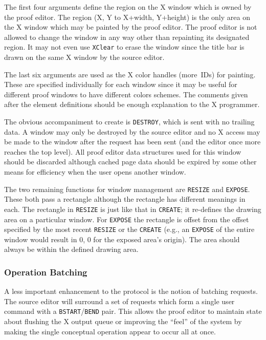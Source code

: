 The first four arguments define the region on the X window which is
owned by the proof editor.  The region (X, Y to X+width, Y+height)
is the only area on the X window which may be painted by the proof
editor.  The proof editor is not allowed to change the window in any
way other than repainting its designated region.  It may not even
use {\tt XClear} to erase the window since the title bar is drawn on
the same X window by the source editor.

The last six arguments are used as the X color handles (more~IDs) for
painting.  These are specified individually for each window since it
may be useful for different proof windows to have different colors
schemes.  The comments given after the element definitions should be
enough explanation to the X programmer.

The obvious accompaniment to create is {\tt DESTROY}, which is sent
with no trailing data.  A window may only be destroyed by the source
editor and no X access may be made to the window after the request
has been sent (and the editor once more reaches the top level).  All
proof editor data structures used for this window should be discarded
although cached page data should be expired by some other means for
efficiency when the user opens another window.

The two remaining functions for window management are {\tt RESIZE}
and {\tt EXPOSE}.  These both pass a rectangle although the rectangle
has different meanings in each.  The rectangle in {\tt RESIZE} is
just like that in {\tt CREATE}; it re-defines the drawing area on a
particular window.  For {\tt EXPOSE} the rectangle is offset from the
offset specified by the most recent {\tt RESIZE} or the {\tt CREATE}
(e.g., an {\tt EXPOSE} of the entire window would result in 0, 0 for
the exposed area's origin).  The area should always be within the
defined drawing area.

\subsubsection{Operation Batching}

A less important enhancement to the protocol is the notion of batching
requests.  The source editor will surround a set of requests which
form a single user command with a {\tt BSTART}/{\tt BEND} pair.  This
allows the proof editor to maintain state about flushing the X output
queue or improving the ``feel'' of the system by making the single
conceptual operation appear to occur all at once.

